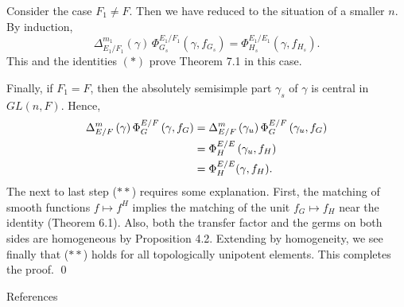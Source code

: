 \documentclass{amsart}
\begin{document}
Consider the case
  $ F_1 \neq F $.
Then we have reduced to the situation of a smaller $n$.
By induction,
%
$$
  \Delta_{E_1/F_1}^{m_1} (\gamma) \,
  \Phi_{G_s}^{E_1/F_1} (\gamma, f_{G_s} ) =
  \Phi_{H_s}^{E_1/E_1}  (\gamma, f_{H_s} ) .
$$
%
This and the identities $(*)$ prove Theorem 7.1 in this case.
%

Finally, if
  $ F_1 = F $,
then the absolutely semisimple part
  $ \gamma_s $
of
  $ \gamma $
is central in
  $ GL(n,F) $.
Hence,
%
\begin{align}\label{eqn:double-star}
 \Delta_{E/F}^m \,
  (\gamma) \,
  \Phi_G^{E/F} \,
  (\gamma, f_G)
&=
  \Delta_{E/F}^m \,
  (\gamma_u) \,
  \Phi_G^{E/F} \,
  (\gamma_u, f_G )
\\
\vspace{4pt}
&=
  \Phi_H^{E/E} \,
  (\gamma_u, f_H ) 
\\
&=
  \Phi_H^{E/E}
  (\gamma, f_H).
\end{align}
%
The next to last step ($**$) requires some explanation.
First, the matching of smooth functions
  $ f \mapsto f^H $
implies the matching 
of the unit
  $ f_G \mapsto f_H$
near the identity (Theorem 6.1).
Also, both the transfer factor and the germs on both sides are
  homogeneous by Proposition 4.2.
Extending by homogeneity, we see finally that
  ($**$) holds for all topologically unipotent elements.
This completes the proof.
\qed
\finishpproclaim

\newpage
\noindent
\centerline{ {\smc References} }
\bigskip
\parindent=11mm
\baselineskip=12pt
\end{document}
